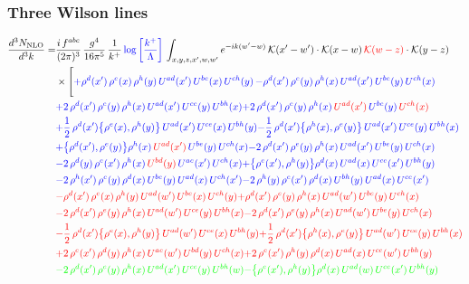 \documentclass[9pt]{article}
\newcommand{\chg}[1]{{\color{red}#1}}
\numberwithin{equation}{section}
\begin{document}
\subsubsection{Three Wilson lines}
\begin{align}
    \frac{d^{3}N_{\rm NLO}}{d^{3}k}= & \frac{i\,f^{abc}}{(2\pi)^{3}}\,\frac{g^{4}}{16\pi^{5}}\,\frac{1}{k^{+}}\,{\color{blue}\log{\left[\frac{k^{+}}{\Lambda}\right]}}\,\int_{x,y,z,x',w,w'}e^{-ik(w'-w)}\,\mathcal{K}(x'-w')\cdot\mathcal{K}(x-w)\,\chg{\mathcal{K}(w-z)}\cdot\mathcal{K}(y-z)\notag \\ & \times\Bigg[{\color{blue}+\rho^{d}(x')\,\rho^{e}(x)\,\rho^{h}(y)\,U^{ad}(x')\,U^{be}(x)\,U^{ch}(y)}\,{\color{blue}-\rho^{d}(x')\,\rho^{e}(y)\,\rho^{h}(x)\,U^{ad}(x')\,U^{be}(y)\,U^{ch}(x)}\notag \\ &{\color{blue}+2\,\rho^{d}(x')\,\rho^{e}(y)\,\rho^{h}(x)\,U^{ad}(x')\,U^{ce}(y)\,U^{bh}(x)}{\color{blue}+2\,\rho^{d}(x')\,\rho^{e}(y)\,\rho^{h}(x)\, {\color{red}U^{ad}(x')}\,U^{be}(y)\,{\color{red}U^{ch}(x)}}\notag \\ & {\color{blue}+\frac{1}{2}\,\rho^{d}(x')\big\{\rho^{e}(x),\rho^{h}(y)\big\}\,U^{ad}(x')\,U^{ce}(x)\,U^{bh}(y)}{\color{blue}-\frac{1}{2}\,\rho^{d}(x')\big\{\rho^{h}(x),\rho^{e}(y)\big\}\,U^{ad}(x')\,U^{ce}(y)\,U^{bh}(x)}\notag \\ & {\color{blue}+\big\{\rho^{d}(x'),\rho^{e}(y)\big\}\rho^{h}(x)\,{\color{red}U^{ad}(x')}\,U^{be}(y)\,U^{ch}(x)}{\color{blue}-2\,\rho^{d}(x')\,\rho^{e}(y)\, \rho^{h}(x)\, U^{ad}(x')\,U^{be}(y)\,U^{ch}(x)}\notag \\ &{\color{blue}-2\,\rho^{d}(y)\,\rho^{e}(x')\, \rho^{h}(x)\, {\color{red}U^{bd}(y)}\,U^{ae}(x')\,U^{ch}(x)}{\color{blue}+\big\{\rho^{e}(x'),\rho^{h}(y)\big\}\rho^{d}(x)\,U^{ad}(x)\,U^{ce}(x')\,U^{bh}(y)}\notag \\ & {\color{blue}-2\,\rho^{h}(x')\,\rho^{e}(y)\,\rho^{d}(x)\,U^{be}(y)\,U^{ad}(x)\,U^{ch}(x')}{\color{blue}-2\,\rho^{h}(y)\,\rho^{e}(x')\,\rho^{d}(x)\,U^{bh}(y)\,U^{ad}(x)\,U^{ce}(x')}\notag \\ & {\color{red}-\rho^{d}(x')\,\rho^{e}(x)\,\rho^{h}(y)\,U^{ad}(w')\,U^{be}(x)\,U^{ch}(y)}{\color{red}+\rho^{d}(x')\,\rho^{e}(y)\,\rho^{h}(x)\,U^{ad}(w')\,U^{be}(y)\,U^{ch}(x)}\notag \\ &{\color{red}-2\,\rho^{d}(x')\,\rho^{e}(y)\,\rho^{h}(x)\,U^{ad}(w')\,U^{ce}(y)\,U^{bh}(x)} {\color{red}-2\,\rho^{d}(x')\,\rho^{e}(y)\,\rho^{h}(x)\, {\color{red}U^{ad}(w')}\,U^{be}(y)\,{\color{red}U^{ch}(x)}}\notag \\ & {\color{red}-\frac{1}{2}\,\rho^{d}(x')\big\{\rho^{e}(x),\rho^{h}(y)\big\}\,U^{ad}(w')\,U^{ce}(x)\,U^{bh}(y)}{\color{red}+\frac{1}{2}\,\rho^{d}(x')\big\{\rho^{h}(x),\rho^{e}(y)\big\}\,U^{ad}(w')\,U^{ce}(y)\,U^{bh}(x)}\notag \\ & {\color{red}+2\,\rho^{e}(x')\,\rho^{d}(y)\, \rho^{h}(x)\, U^{ae}(w')\,U^{bd}(y)\,U^{ch}(x)}{\color{red}+2\,\rho^{e}(x')\,\rho^{h}(y)\,\rho^{d}(x)\,U^{ad}(x)\,U^{ce}(w')\,U^{bh}(y)}\notag \\ & {\color{green}-2\,\rho^{d}(x')\,\rho^{e}(y)\,\rho^{h}(x)\,U^{ad}(x')\,U^{ce}(y)\,U^{bh}(w)}{\color{green}-\big\{\rho^{e}(x'),\rho^{h}(y)\big\}\rho^{d}(x)\,U^{ad}(w)\,U^{ce}(x')\,U^{bh}(y)}\notag \\ & 
\end{align}
\end{document}
